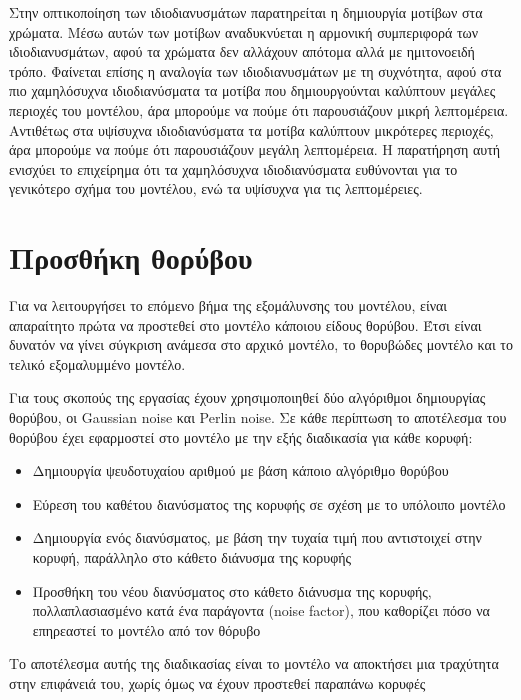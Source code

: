 \documentclass[draft]{article}
\begin{document}
Στην οπτικοποίηση των ιδιοδιανυσμάτων παρατηρείται η δημιουργία μοτίβων στα χρώματα.
Μέσω αυτών των μοτίβων αναδυκνύεται η αρμονική συμπεριφορά των ιδιοδιανυσμάτων, αφού τα
χρώματα δεν αλλάχουν απότομα αλλά με ημιτονοειδή τρόπο. Φαίνεται επίσης η αναλογία
των ιδιοδιανυσμάτων με τη συχνότητα, αφού στα πιο χαμηλόσυχνα ιδιοδιανύσματα
τα μοτίβα που δημιουργούνται καλύπτουν μεγάλες περιοχές του μοντέλου, άρα μπορούμε
να πούμε ότι παρουσιάζουν μικρή λεπτομέρεια. Αντιθέτως στα υψίσυχνα ιδιοδιανύσματα τα μοτίβα
καλύπτουν μικρότερες περιοχές, άρα μπορούμε να πούμε ότι παρουσιάζουν μεγάλη λεπτομέρεια.
Η παρατήρηση αυτή ενισχύει το επιχείρημα ότι τα χαμηλόσυχνα ιδιοδιανύσματα ευθύνονται για
το γενικότερο σχήμα του μοντέλου, ενώ τα υψίσυχνα για τις λεπτομέρειες.


\section{Προσθήκη θορύβου}
Για να λειτουργήσει το επόμενο βήμα της εξομάλυνσης του μοντέλου,
είναι απαραίτητο πρώτα να προστεθεί στο μοντέλο κάποιου είδους θορύβου.
Έτσι είναι δυνατόν να γίνει σύγκριση ανάμεσα στο αρχικό μοντέλο,
το θορυβώδες μοντέλο και το τελικό εξομαλυμμένο μοντέλο.

Για τους σκοπούς της εργασίας έχουν χρησιμοποιηθεί δύο αλγόριθμοι
δημιουργίας θορύβου, οι Gaussian noise και Perlin noise.
Σε κάθε περίπτωση το αποτέλεσμα του θορύβου έχει εφαρμοστεί στο
μοντέλο με την εξής διαδικασία για κάθε κορυφή:

\begin{itemize}
	\item Δημιουργία ψευδοτυχαίου αριθμού με βάση κάποιο αλγόριθμο θορύβου
	\item Εύρεση του καθέτου διανύσματος της κορυφής σε σχέση με το υπόλοιπο μοντέλο
	\item Δημιουργία ενός διανύσματος, με βάση την τυχαία τιμή που αντιστοιχεί στην
		κορυφή, παράλληλο στο κάθετο διάνυσμα της κορυφής
	\item Προσθήκη του νέου διανύσματος στο κάθετο διάνυσμα της κορυφής,
		πολλαπλασιασμένο κατά ένα παράγοντα (noise factor),
		που καθορίζει πόσο να επηρεαστεί το μοντέλο από τον θόρυβο
\end{itemize}

Το αποτέλεσμα αυτής της διαδικασίας είναι το μοντέλο να αποκτήσει μια τραχύτητα στην
επιφάνειά του, χωρίς όμως να έχουν προστεθεί παραπάνω κορυφές
\end{document}
